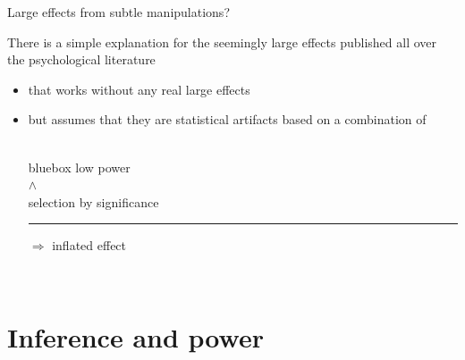 \documentclass[aspectratio=169]{beamer}
\newenvironment{colbox}[1][\textwidth]%
  {\begin{beamercolorbox}[wd=#1, rounded=true, shadow=true]{bluebox}}
  {\end{beamercolorbox}}
\begin{document}


\begin{frame}{Large effects from subtle manipulations?}

There is a simple explanation for the seemingly large effects published all
over the psychological literature\\[2ex]

\begin{itemize}
\item that works without any real large effects

\item but assumes that they are statistical artifacts based on a combination
of\\[2ex]

~\hfill\begin{colbox}[5cm]
\centering
low power\\
$\wedge$\\
selection by significance\\[1ex]
\hrule\vspace{1ex}
$\Rightarrow$ inflated effect
\end{colbox}\hfill~

\vspace{2ex}

\citep[type M error;][]{GelmanCarlin14}
\end{itemize}

\end{frame}

%
%

%


\section{Inference and power}
\end{document}
